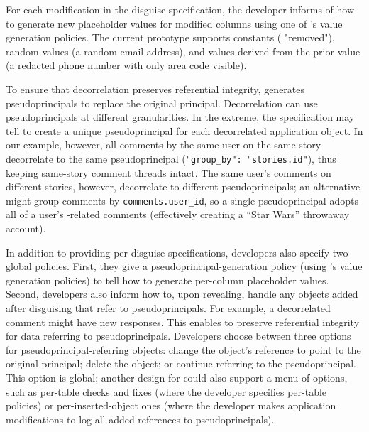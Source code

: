 %
For each modification in the disguise specification, the developer informs \sys
of how to generate new placeholder values for modified columns using one of
\sys's value generation policies. The current prototype supports constants (\eg
"removed"), random values (\eg a random email address), and values derived from
the prior value (\eg a redacted phone number with only area code visible).
%

%
To ensure that decorrelation preserves referential integrity, \sys generates
pseudoprincipals to replace the original principal. 
%
Decorrelation can use pseudoprincipals at different granularities.  In the
extreme, the \xx specification may tell \sys to create a unique pseudoprincipal
for each decorrelated application object.  In our example, however, all comments
by the same user on the same story decorrelate to the same pseudoprincipal
(\verb+"group_by": "stories.id"+), thus keeping same-story comment threads
intact.
%
The same user's comments on different stories, however, decorrelate to different
pseudoprincipals; an alternative might group comments by
\texttt{comments.user\_id}, so a single pseudoprincipal adopts all of a user's
-related comments (effectively creating a ``Star Wars'' throwaway
account).


In addition to providing per-disguise specifications, developers also specify
two global policies. First, they give \sys a pseudoprincipal-generation policy
(using \sys's value generation policies) to tell \sys how to generate per-column
placeholder values.
%
%
%
Second, developers also inform \sys how to, upon revealing, handle any objects
added after disguising that refer to pseudoprincipals. For example, a
decorrelated comment might have new responses. This enables \sys to preserve
referential integrity for data referring to pseudoprincipals. Developers choose
between three options for pseudoprincipal-referring objects: \one{} change the
object's reference to point to the original principal; \two{} delete the object;
or \three{} continue referring to the pseudoprincipal.
%
This option is global; another design for \sys could also support a menu of
options, such as per-table checks and fixes (where the developer specifies
per-table policies) or per-inserted-object ones (where the developer makes
application modifications to log all added references to pseudoprincipals).


%
%
%
%
%
%
%
%


